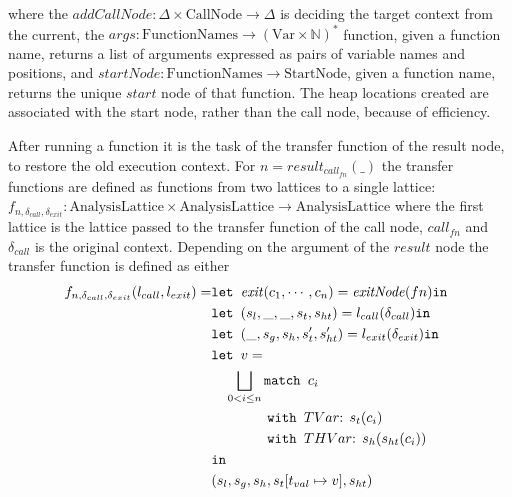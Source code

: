 where the $\mathit{addCallNode} : \Delta \times \text{CallNode} \rightarrow \Delta$ is deciding the target context from the current, the $\mathit{args} : \text{FunctionNames} \rightarrow (\text{Var} \times \mathbb{N})^*$ function, given a function name, returns a list of arguments expressed as pairs of variable names and positions, and $\mathit{startNode} : \text{FunctionNames} \rightarrow \text{StartNode}$, given a function name, returns the unique $\mathit{start}$ node of that function. The heap locations created are associated with the start node, rather than the call node, because of efficiency. 

After running a function it is the task of the transfer function of the result node, to restore the old execution context.  For $n = \mathit{result}_{\mathit{call}_{fn}}(\_)$ the transfer functions are defined as functions from two lattices to a single lattice: $f_{n,\delta_{call},\delta_{exit}}: \text{AnalysisLattice} \times \text{AnalysisLattice} \rightarrow \text{AnalysisLattice}$ where the first lattice is the lattice passed to the transfer function of the call node, ${\mathit{call}_{fn}}$ and $\delta_{call}$ is the original context. Depending on the argument of the $\mathit{result}$ node the transfer function is defined as either
\begin{align}
f_{n,\delta_{call}, \delta_{exit}}(l_{call}, l_{exit})=   &\texttt{let } \mathit{exit}(c_1, \cdots, c_n) = \mathit{exitNode}(fn) \texttt{in }\notag\\
                                                &\texttt{let } (s_l, \_, \_, s_t, s_{ht}) = l_{call}(\delta_{call}) \texttt{in }\notag\\
                                                &\texttt{let } (\_, s_g, s_h, s_t', s_{ht}') = l_{exit}(\delta_{exit}) \texttt{in }\notag\\
                                                &\texttt{let } v = \notag\\
                                                &\quad \bigsqcup_{0<i \leq n} \texttt{match }c_i\notag\\
                                                &\quad\quad\quad\quad \texttt{with }TVar\text{: } s_t(c_i)\notag\\
                                                &\quad\quad\quad\quad \texttt{with }THVar\text{: } s_h(s_{ht}(c_i))\notag\\
                                                & \texttt{in }\notag\\
                                                &(s_l,s_g,s_h, s_t[t_{val}\mapsto v], s_{ht})
\end{align}
